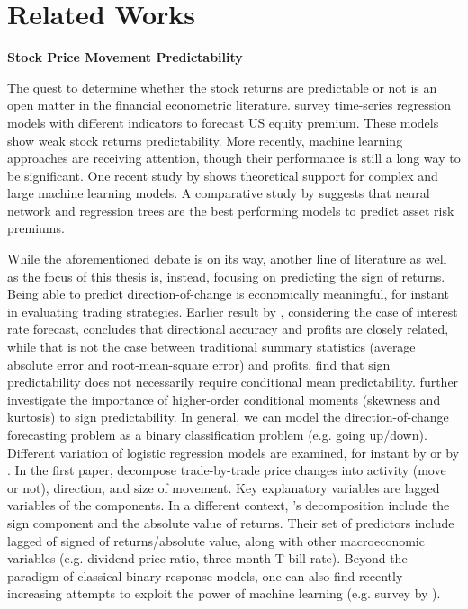 \chapter{Related Works}\label{chap:relatedwork}

{\bfseries Stock Price Movement Predictability}

The quest to determine whether the stock returns are predictable or not is an open matter in the financial econometric literature. \citet{rapach_forecasting_2013} survey time-series regression models with different indicators to forecast US equity premium. These models show weak stock returns predictability. More recently, machine learning approaches are receiving attention, though their performance is still a long way to be significant. One recent study by \citet{kelly_virtue_2024} shows theoretical support for complex and large machine learning models. A comparative study by \citet{gu_empirical_2020} suggests that neural network and regression trees are the best performing models to predict asset risk premiums. 

While the aforementioned debate is on its way, another line of literature as well as the focus of this thesis is, instead, focusing on predicting the sign of returns. Being able to predict direction-of-change is economically meaningful, for instant in evaluating trading strategies. Earlier result by \citet{leichttanner1991}, considering the case of interest rate forecast, concludes that directional accuracy and profits are closely related, while that is not the case between traditional summary statistics (average absolute error and root-mean-square error) and profits. \citet{christoffersen_financial_2006} find that sign predictability does not necessarily require conditional mean predictability. \citet{christoffersenetal2007} further investigate the importance of higher-order conditional moments (skewness and kurtosis) to sign predictability. In general, we can model the direction-of-change forecasting problem as a binary classification problem (e.g. going up/down). Different variation of logistic regression models are examined, for instant by \citet{rydbergshephard2003} or by \citet{anatolyevgospodinov2010}. In the first paper, \citet{rydbergshephard2003} decompose trade-by-trade price changes into activity (move or not), direction, and size of movement. Key explanatory variables are lagged variables of the components. In a different context, \citet{anatolyevgospodinov2010}’s decomposition include the sign component and the absolute value of returns. Their set of predictors include lagged of signed of returns/absolute value, along with other macroeconomic variables (e.g. dividend-price ratio, three-month T-bill rate). Beyond the paradigm of classical binary response models, one can also find recently increasing attempts to exploit the power of machine learning (e.g. survey by \citet{bustos_stock_2020}).  

